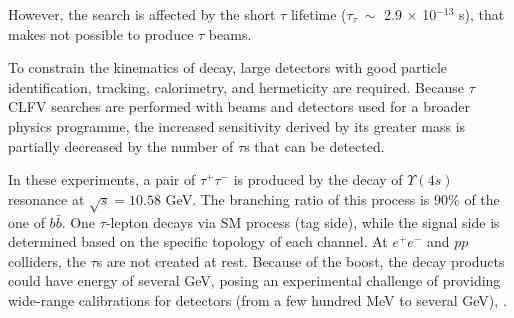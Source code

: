 However, the search is affected by the   
short $\tau$ lifetime  
($\tau_\tau \ \sim$ 2.9 $\times$ 10$^{-13}$ s), that 
makes not possible to produce 
$\tau$ beams.

To constrain the kinematics of decay, 
large detectors with good particle 
identification, tracking, calorimetry, 
and hermeticity are required. 
Because $\tau$ CLFV searches are performed  
with beams and detectors used for a 
broader physics programme, 
the increased sensitivity derived by 
its greater mass is partially decreased 
by the number of $\tau$s that can be detected.

In these experiments, a pair of 
$\tau^+ \tau^-$ is produced by the 
decay of $\Upsilon(4s)$ resonance at 
$\sqrt{s}=10.58$ GeV. The branching ratio 
of this process is  $90\%$ of 
the one of $b \bar{b}$. One $\tau$-lepton decays 
via SM process (tag side), 
while the signal side is determined based on 
the specific topology of each channel. 
At $e^+ e^-$ and $pp$ colliders, the $\tau$s 
are not created at rest. Because of the boost, 
the decay products could have 
energy of several GeV, posing an experimental 
challenge of providing wide-range calibrations 
for detectors (from a few hundred MeV to several GeV), 
\cite{universe8060299}.

